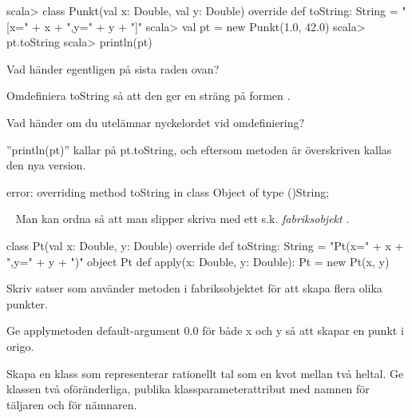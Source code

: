 \begin{REPL}
scala> class Punkt(val x: Double, val y: Double) {
         override def toString: String = "[x=" + x + ",y=" + y + "]"
       }
scala> val pt = new Punkt(1.0, 42.0)
scala> pt.toString
scala> println(pt)
\end{REPL}

\Subtask Vad händer egentligen på sista raden ovan?

\Subtask Omdefiniera toString så att den ger en sträng på formen .

\Subtask Vad händer om du utelämnar nyckelordet  vid omdefiniering?

\SOLUTION


\TaskSolved \what


\SubtaskSolved
''println(pt)'' kallar på pt.toString, och eftersom metoden är överskriven kallas den nya version.

\SubtaskSolved   {}

\SubtaskSolved
error: overriding method toString in class Object of type ()String;


\QUESTEND









\QUESTBEGIN

\Task  \what~  Man kan ordna så att man slipper skriva  med ett s.k. \emph{fabriksobjekt} .
\begin{Code}
class Pt(val x: Double, y: Double) {
  override def toString: String = "Pt(x=" + x + ",y=" + y + ")"
}
object Pt {
  def apply(x: Double, y: Double): Pt = new Pt(x, y)
}
\end{Code}

\Subtask Skriv satser som använder metoden  i fabriksobjektet  för att skapa flera olika punkter.

\Subtask Ge applymetoden default-argument 0.0 för både x och y så att  skapar en punkt i origo.

\Subtask Skapa en klass  som representerar rationellt tal som en kvot mellan två heltal. Ge klassen två oföränderliga, publika klassparameterattribut med namnen  för täljaren och  för nämnaren.

